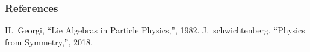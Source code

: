 \documentclass{beamer}
\begin{document}
\begin{frame}
\frametitle{References}
\footnotesize{
\begin{thebibliography}{99} %
 H.~Georgi, ``Lie Algebras in Particle Physics,'', 1982.
 J.~schwichtenberg, ``Physics from Symmetry,'', 2018.

\end{thebibliography}
}
\end{frame}
\end{document}
